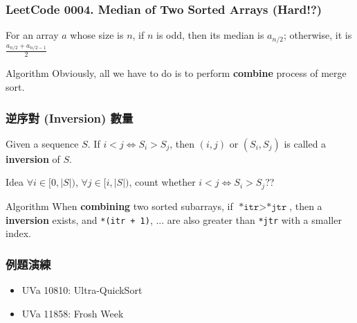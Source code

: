 \documentclass{beamer}
\begin{document}
\frame
{
	\frametitle{LeetCode 0004. Median of Two Sorted Arrays (Hard!?)}
	
	\begin{definition}[Median]
		For an array $a$ whose size is $n$, if $n$ is odd, then its median is $a_{n/ 2}$; otherwise, it is $\frac{a_{n/2} + a_{n/2 - 1}}{2}$
	\end{definition}
	\pause
	
	\begin{block}{Algorithm}
		Obviously, all we have to do is to perform \textbf{combine} process of merge sort.
	\end{block}
}

\frame
{
	\frametitle{逆序對 (Inversion) 數量}
	
	\begin{definition}[Inversion]
		Given a sequence $S$. If $i < j \iff S_i > S_j$, then $(i, j)$ or $(S_i, S_j)$ is called a \textbf{inversion} of $S$.
	\end{definition}
	\pause
	
	\begin{block}{Idea}
		$\forall i \in [0, |S|)$, $\forall j \in [i, |S|)$, count whether $i < j \iff S_i > S_j$??
	\end{block}
	\pause
	
	\begin{block}{Algorithm}
		When \textbf{combining} two sorted subarrays, if $\texttt{*itr} > \texttt{*jtr}$, then a \textbf{inversion} exists, and \texttt{*(itr + 1)}, ... are also greater than \texttt{*jtr} with a smaller index.
	\end{block}
}

\frame
{
	\frametitle{例題演練}
	
	\begin{itemize}
		\item UVa 10810: Ultra-QuickSort
		\item UVa 11858: Frosh Week
	\end{itemize}
}
\end{document}
